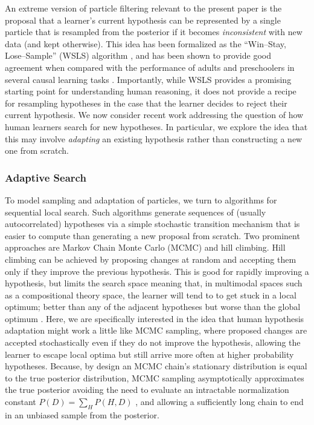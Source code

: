 \documentclass[doc,natbib,floatsintext]{apa7}
\begin{document}
An extreme version of particle filtering relevant to the present paper is the proposal that a learner's current hypothesis can be represented by a single particle that is resampled from the posterior if it becomes \textit{inconsistent} with new data (and kept otherwise). This idea has been formalized as the ``Win--Stay, Lose--Sample'' (WSLS) algorithm \citep{bonawitz2014win}, and has been shown to provide good agreement when compared with the performance of adults and preschoolers in several causal learning tasks \citep{bonawitz2014win,bonawitz2014probabilistic}. Importantly, while WSLS provides a promising starting point for understanding human reasoning, it does not provide a recipe for resampling hypotheses in the case that the learner decides to reject their current hypothesis. We now consider recent work addressing the question of how human learners search for new hypotheses. In particular, we explore the idea that this may involve \textit{adapting} an existing hypothesis rather than constructing a new one from scratch.

\subsubsection{Adaptive Search}
To model sampling and adaptation of particles, we turn to algorithms for sequential local search. Such algorithms generate sequences of (usually autocorrelated) hypotheses via a simple stochastic transition mechanism that is easier to compute than generating a new proposal from scratch. Two prominent approaches are Markov Chain Monte Carlo (MCMC) and hill climbing. Hill climbing can be achieved by proposing changes at random and accepting them only if they improve the previous hypothesis. This is good for rapidly improving a hypothesis, but limits the search space meaning that, in multimodal spaces such as a compositional theory space, the learner will tend to to get stuck in a local optimum; better than any of the adjacent hypotheses but worse than the global optimum \citep{ullman2012theory}. Here, we are specifically interested in the idea that human hypothesis adaptation might work a little like MCMC sampling, where proposed changes are accepted stochastically even if they do not improve the hypothesis, allowing the learner to escape local optima but still arrive more often at higher probability hypotheses. Because, by design an MCMC chain's stationary distribution is equal to the true posterior distribution, MCMC sampling asymptotically approximates the true posterior avoiding the need to evaluate an intractable normalization constant \(P(D) = \sum_{H}P(H,D)\) \citep{griffiths2007language}, and allowing a sufficiently long chain to end in an unbiased sample from the posterior. 
\end{document}
